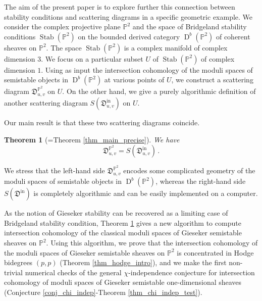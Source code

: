 \documentclass[12pt, a4paper]{amsart}
\newtheorem{thm}[defn]{Theorem}
\newcommand\PP{\mathbb P}
\newcommand\fD{\mathfrak D}
\newcommand\Stab{\operatorname{Stab}}
\newcommand\D{\operatorname{D}}
\newcommand\iin{\mathrm{in}}
\begin{document}
The aim of the present paper is to explore further this connection between stability conditions and scattering diagrams in a specific geometric example.
We consider the complex projective plane 
$\PP^2$ and the space of Bridgeland stability conditions
$\Stab(\PP^2)$ \cite{MR2373143} on the bounded derived category $\D^b(\PP^2)$ of coherent sheaves on $\PP^2$.
The space $\Stab (\PP^2)$ is a complex manifold of complex dimension $3$. We focus on a 
particular subset $U$ of $\Stab (\PP^2)$ of complex dimension $1$. Using as input the intersection cohomology of the moduli spaces of semistable objects in $\D^b(\PP^2)$ at various points of $U$, we 
construct a scattering diagram $\fD^{\PP^2}_{u,v}$ on $U$. On the other hand, we give a purely algorithmic definition of another scattering diagram 
$S(\fD^{\iin}_{u,v})$ on $U$.

Our main result is that these two scattering diagrams coincide.

\begin{thm}[=Theorem \ref{thm_main_precise}] \label{main_thm}
We have 
\[ \fD^{\PP^2}_{u,v} = S(\fD^{\iin}_{u,v}) \,.\]
\end{thm}


We stress that the left-hand side $\fD_{u,v}^{\PP^2}$ encodes some complicated geometry of the moduli spaces 
of semistable objects in $\D^b(\PP^2)$, whereas the right-hand side $S(\fD^{\iin})$ is completely algorithmic and can be easily implemented on a computer. 


As the notion of Gieseker stability can be recovered as a limiting case of Bridgeland stability condition, Theorem \ref{main_thm}
gives a new algorithm to compute  intersection cohomology of the classical \cite{huybrechts2010geometry} moduli spaces of Gieseker semistable sheaves
on $\PP^2$. Using this algorithm, we prove that the intersection cohomology of the moduli spaces of Gieseker semistable sheaves on $\PP^2$ is concentrated in Hodge bidegrees $(p,p)$ (Theorem \ref{thm_hodge_intro}), and we make the first non-trivial numerical checks of the general 
$\chi$-independence conjecture for intersection cohomology of moduli spaces of Gieseker semistable one-dimensional sheaves (Conjecture \ref{conj_chi_indep}-Theorem \ref{thm_chi_indep_test}). 
\end{document}
